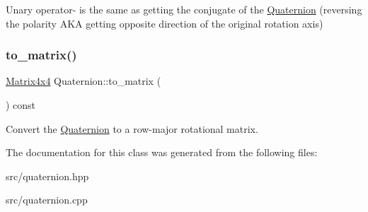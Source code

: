 Unary operator-\/ is the same as getting the conjugate of the \mbox{\hyperlink{class_quaternion}{Quaternion}} (reversing the polarity A\+KA getting opposite direction of the original rotation axis) \mbox{\label{class_quaternion_ae0309902fc8b7d8aa1f4075a73fee928}} 
\subsubsection{\texorpdfstring{to\+\_\+matrix()}{to\_matrix()}}
{\footnotesize\ttfamily \mbox{\hyperlink{class_matrix4x4}{Matrix4x4}} Quaternion\+::to\+\_\+matrix (\begin{DoxyParamCaption}{ }\end{DoxyParamCaption}) const}

Convert the \mbox{\hyperlink{class_quaternion}{Quaternion}} to a row-\/major rotational matrix. 

The documentation for this class was generated from the following files\+:\begin{DoxyCompactItemize}
\item 
src/quaternion.\+hpp\item 
src/quaternion.\+cpp\end{DoxyCompactItemize}
